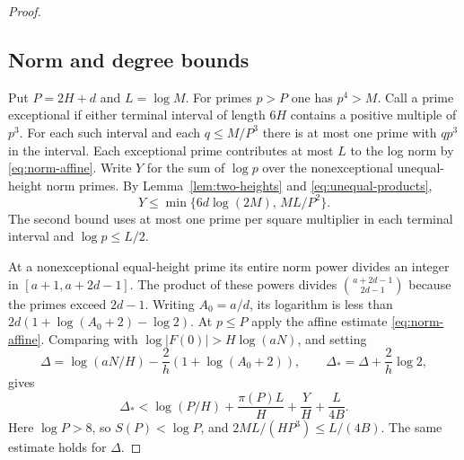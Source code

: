 \begin{proof}
\subsection*{Norm and degree bounds}

Put \(P=2H+d\) and \(L=\log M\). For primes \(p>P\) one
has \(p^4>M\). Call a prime exceptional if either terminal
interval of length \(6H\) contains a positive multiple of
\(p^3\). For each such interval and each \(q\le M/P^3\)
there is at most one prime with \(qp^3\) in the interval.
Each exceptional prime contributes at most \(L\) to the log
norm by \eqref{eq:norm-affine}. Write \(Y\) for the sum of
\(\log p\) over the nonexceptional unequal-height norm primes.
By Lemma~\ref{lem:two-heights} and \eqref{eq:unequal-products},
\begin{equation}\label{eq:large-two-y}
 Y\le \min\{6d\log(2M),\,ML/P^2\}.
\end{equation}
The second bound uses at most one prime per square multiplier
in each terminal interval and \(\log p\le L/2\).

At a nonexceptional equal-height prime its entire norm
power divides an integer in \([a+1,a+2d-1]\).
The product of these powers divides \(\binom{a+2d-1}{2d-1}\)
because the primes exceed \(2d-1\).
Writing \(A_0=a/d\), its logarithm is less than
\(2d(1+\log(A_0+2)-\log2)\).
At \(p\le P\) apply the affine estimate
\eqref{eq:norm-affine}. Comparing with
\(\log|F(0)|>H\log(aN)\), and setting
\[
 \Delta=\log(aN/H)-\frac2h(1+\log(A_0+2)),
 \qquad \Delta_*=\Delta+\frac2h\log2 ,
\]
gives
\begin{equation}\label{eq:large-norm}
 \Delta_*<\log(P/H)+\frac{\pi(P)L}{H}+\frac{Y}{H}+\frac{L}{4B}.
\end{equation}
Here \(\log P>8\), so \(S(P)<\log P\), and
\(2ML/(HP^3)\le L/(4B)\). The same estimate holds for \(\Delta\).


\end{proof}
